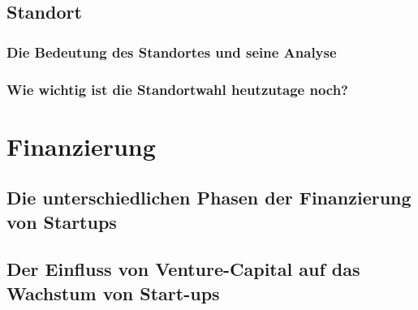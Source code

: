 \section{Standort}
\subsection{Die Bedeutung des Standortes und seine Analyse}

\subsection{Wie wichtig ist die Standortwahl heutzutage noch?}

\chapter{Finanzierung}
\section{Die unterschiedlichen Phasen der Finanzierung von Startups}

\section{Der Einfluss von Venture-Capital auf das Wachstum von Start-ups}

